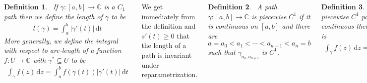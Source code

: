 \documentclass{tikzposter} %
\newtheorem{definition}{Definition}
\begin{document}
\begin{columns}
{  
  \hphantom{}

  \begin{definition}
  \ If $\gamma : [a,b] \to \mathbb{C}$ is a $C_{1}$ path then we define the length of $\gamma$ to be
    \begin{align*}
      l(\gamma) = \int_{a}^{b} |\gamma'(t)|\,\mathrm{d}t
    \end{align*}
    More generally, we define the integral with respect to arc-length of a function $f : U \to \mathbb{C}$ with $\gamma^{*} \subseteq U$ to be
    \begin{align*}
      \int_{\gamma} f(z) \,\mathrm{d}z = \int_{a}^{b} f(\gamma(t)) |\gamma'(t)| \, \mathrm{d}t
    \end{align*}
  \end{definition}
  \hphantom{}

  We get immediately from the definition and $s'(t) \ge 0$ that the length of a path is invariant under reparametrization. \\

  \begin{definition}
  \ A path $\gamma : [a,b] \to \mathbb{C}$ is piecewise $C^{1}$ if it is continuous on $[a,b]$ and there are $a = a_{0} < a_{1} < \cdots < a_{n-1} < a_{n} = b$ such that $\gamma_{a_{k},a_{k+1}}$ is $C^{1}$.
  \end{definition}
  \hphantom{}

  \begin{definition}
  \ If $\gamma : [a,b] \to \mathbb{C}$ is a piecewise $C^{1}$ path in $U$ and $f : U \to \mathbb{C}$ is continuous then the integral of $f$ along $\gamma$ is
    \begin{align*}
      \int_{\gamma} f(z)\, \mathrm{d}z = \int_{a}^{b} f(\gamma(t)) \gamma'(t) \, \mathrm{d}t
    \end{align*}
  \end{definition}
  \hphantom{}

  Note that the integral still exists where $\gamma'$ does not exist at finitely many points, because we can take a sum of the individual pieces to reform the integral. \\

  Under this definition we get yet another property of equivalent paths: they preserve integrals. To show this, take $\gamma : [a,b] \to \mathbb{C}$, $\psi : [c,d] \to [a,b]$, and we get
  \begin{align*}
    \int_{\gamma \circ \psi} f(z) \, \mathrm{d}z &= \int_{c}^{d} f(\gamma(\psi(t))) \gamma'(\psi(t)) \psi'(t) \, \mathrm{d}t \\
                                  &= \int_{a}^{b} f(\gamma(u)) \gamma'(u) \, \mathrm{d}u \\
    &= \int_{\gamma} f(z) \, \mathrm{d}z
  \end{align*}

}
\end{columns}
\end{document}
